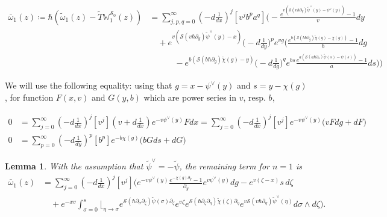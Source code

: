 \documentclass[10pt,a4paper,oneside,no-math,reqno]{amsart}%
\theoremstyle{plain}
\newtheorem{lemma}[theorem]{Lemma}
\theoremstyle{definition}
\theoremstyle{remark}
\numberwithin{equation}{section}
\newcommand{\mb}[1]{\mathbb{#1}}
\newcommand{\mc}[1]{\mathcal{#1}}
\newcommand{\1}{\mathds{1}}
\newcommand{\<}{\langle}
\renewcommand{\>}{\rangle}
\newcommand{\del}{\partial}
\begin{document}
\begin{equation}\label{ExtraTermForn=1}
	\begin{split}
		\bar{\omega}_1 (z) 
		\coloneqq
		\hbar ( \tilde{\omega}_1 (z) - \tilde{T}\mb{W}^{\mc{S}_0}_1(z) )
		&=
		\sum_{j,p,q=0}^\infty (-d \frac{1}{dx})^j [v^j b^p a^q] 
		\Bigg( - \frac{e^{v ( \mc{S}(v\hbar \del_{y}) \tilde{\psi}^\vee(y) - \psi^\vee (y) )} - 1}{v} dy
    \\
    &\quad
    + 
    e^{v ( \mc{S}(v\hbar \del_{y}) \tilde{\psi}^\vee(y) - x)} \big( -d \frac{1}{dy} \big)^p 
		e^{vg} \bigg( \frac{e^{b ( \mc{S}(b\hbar \del_g) \tilde{\chi}(g) - \chi (g) )} -1}{b} dg 
    \\
    &\qquad \quad
    - 
    e^{b ( \mc{S}(b\hbar \del_g) \tilde{\chi}(g) - y )}  \big( -d \frac{1}{dg} \big)^q
    e^{bs} \frac{e^{a ( \mc{S}(a\hbar \del_s) \tilde{\psi}(s) - \psi (s) )} - 1 }{a} ds \bigg) \Bigg)
	\end{split}
\end{equation}

We will use the following equality: using that $ g = x - \psi^\vee (y)$ and $ s = y - \chi (g)$, for function $ F(x,v)$ and $ G(y,b)$ which are power series in $ v$, resp. $b$,

\begin{align}
  0
  &=
  \sum_{j=0}^\infty ( - d \frac{1}{dx} )^j [v^j] ( v +  d \frac{1}{dx}) e^{-v \psi^\vee (y) } F dx 
  =
  \sum_{j=0}^\infty ( - d \frac{1}{dx} )^j [v^j] e^{-v \psi^\vee (y)} \big( v F dg + dF \big)
  \label{IntByPartsx}
  \\
  0
  &=
  \sum_{p=0}^\infty ( - d \frac{1}{dy} )^p [b^p] e^{-b \chi (g)} \big( b G ds + dG \big) 
  \label{IntByPartsy}
\end{align}


\begin{lemma}
	With the assumption that $ \tilde{\psi}^\vee = - \tilde{\psi}$, the remaining term for $ n =1$ is
	\begin{equation}
		\begin{split}
			\bar{\omega}_1 (z)
      &=
      \sum_{j=0}^\infty (-d \frac{1}{dx})^j [v^j ] 
			\Bigg( 
      e^{-v \psi^\vee (y)}  \frac{e^{-\chi (g) \del_y} - 1}{\del_y} e^{v \psi^\vee (y )} dg 
      - 
      e^{v (\zeta - x)} s \, d\zeta
      \\
      &\quad
      + 
      e^{-xv}
      \int_{\sigma = 0}^s \Big\lfloor_{\eta \to \sigma} e^{ \mc{S}(\hbar \del_\sigma \del_\zeta) \tilde{\psi}(\sigma) \del_\zeta} e^{v\zeta} e^{ \mc{S}(\hbar \del_\zeta \del_\eta) \tilde{\chi}(\zeta) \del_\eta }
			e^{v \mc{S}(v\hbar \del_{\eta}) \tilde{\psi}^\vee(\eta) } d\sigma \wedge d\zeta
      \Bigg) .
		\end{split}
	\end{equation}
\end{lemma}
\end{document}
